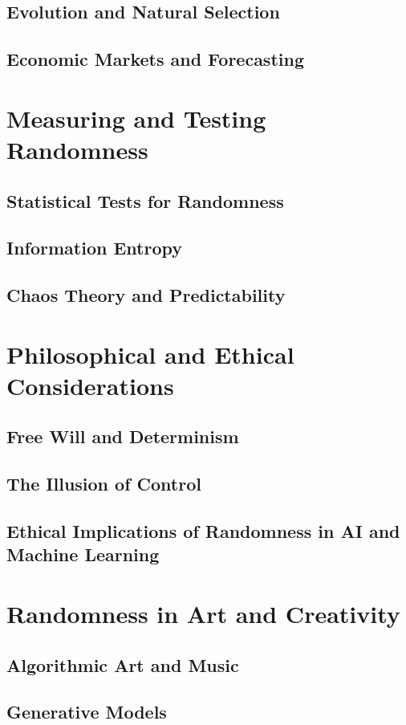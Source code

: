 \documentclass[12pt]{book} %
\begin{document}
\subsection{Evolution and Natural Selection}
\subsection{Economic Markets and Forecasting}

\section{Measuring and Testing Randomness}
\subsection{Statistical Tests for Randomness}
\subsection{Information Entropy}
\subsection{Chaos Theory and Predictability}

\section{Philosophical and Ethical Considerations}
\subsection{Free Will and Determinism}
\subsection{The Illusion of Control}
\subsection{Ethical Implications of Randomness in AI and Machine Learning}

\section{Randomness in Art and Creativity}
\subsection{Algorithmic Art and Music}
\subsection{Generative Models}
\end{document}

